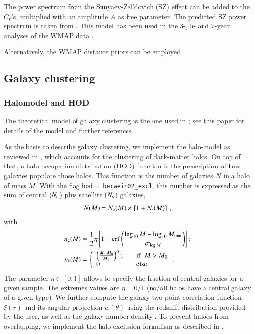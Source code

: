 \documentclass[11pt, chapterprefix, headsepline]{scrartcl}
\begin{document}
The power spectrum from the Sunyaev-Zel'dovich (SZ) effect can be added to the
$C_\ell$'s, multiplied with an amplitude $A$ as free parameter. The
predicted SZ power spectrum is taken from
\cite{2002MNRAS.336.1256K}. This model has been used in the 3-, 5- and
7-year analyses of the WMAP data \citep{2010arXiv1001.4538K}.

Alternatively, the WMAP distance priors \citep{WMAP5-Komatsu08} can be employed.


\subsection{Galaxy clustering}


\subsubsection{Halomodel and HOD}


The theoretical model of galaxy clustering is the one used in
\cite{CK11}; see this paper for details of the model and further
references.

As the basis to describe galaxy clustering, we implement the
halo-model as reviewed in \citep{2002PhR...372....1C}, which accounts
for the clustering of dark-matter halos. On top of that, a halo
occupation distribution (HOD) function
\citep{2002ApJ...575..587B, 2004ApJ...609...35K, 2005ApJ...633..791Z} is
the prescription of how galaxies populate those halos. This function is
the number of galaxies $N$ in a halo of mass $M$. With the flag
\texttt{hod = berwein02\_excl}, this number is expressed as the sum of
central ($N_{\rm c}$) plus satellite ($N_{\rm s}$) galaxies,
%
\begin{equation}
N(M) = N_{\rm c}(M)\times\left [1 + N_{\rm s}(M) \right ] \, ,
\end{equation}
with
%
\begin{align}
 n_{\rm c}(M) & = \frac 1 2 \eta \left[ 1 + {\rm erf}\left( \frac{\log_{10}
       M - \log_{10} M_{\rm min}}{\sigma_{\log M}}\right) \right]; \\
  n_{\rm s}(M) & = \left\{ \begin{array}{ll}
      \left( \frac{M-M_0}{M_1}
      \right)^\alpha; \quad &
      \mbox{if} \;\; M>M_0 \\
      0 & \mbox{else}
    \end{array} \right. .
\end{align}
%
The parameter $\eta \in [0; 1]$ allows to specify the fraction of central galaxies for a given sample.
The extremes values are $\eta = 0/1$ (no/all halos have a central galaxy of a given type).
We further compute the galaxy two-point correlation function $\xi(r)$
and its angular projection $w(\theta)$ using the redshift
distribution provided by the user, as well as the galaxy number density 
\citep[for a full description of the model see][]{CK11}.
To prevent haloes from overlapping, we implement the halo exclusion
formalism as described in \cite{2005ApJ...631...41T}.
\end{document}
